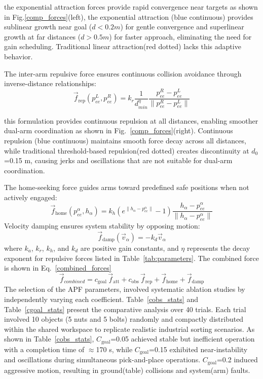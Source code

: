 \documentclass[pdflatex,sn-mathphys-num]{sn-jnl}%
\theoremstyle{thmstyleone}%
\theoremstyle{thmstylethree}%
\begin{document}
\noindent the exponential attraction forces provide rapid convergence near targets as shown in Fig.\ref{comp_forces}(left), the exponential attraction (blue continuous) provides sublinear growth near goal ($d<0.2m$) for gentle convergence and superlinear growth at far distances ($d>0.5m$) for faster approach, eliminating the need for gain scheduling. Traditional linear attraction(red dotted) lacks this adaptive behavior.

\noindent The inter-arm repulsive force ensures continuous collision avoidance through inverse-distance relationships:
\begin{equation}
\vec{f}_{\text{rep}}(p_{ee}^L, p_{ee}^R) = k_r \frac{1}{d_{min}^{\eta}} \frac{p_{ee}^R - p_{ee}^L}{\lVert p_{ee}^R - p_{ee}^L\rVert}
\label{eq:repulsive_force}
\end{equation}

this formulation provides continuous repulsion at all distances, enabling smoother dual-arm coordination as shown in Fig.~\ref{comp_forces}(right). Continuous repulsion (blue continuous) maintains smooth force decay across all distances, while traditional threshold-based repulsion(red dotted) creates discontinuity at $d_{0}$=0.15 m, causing jerks and oscillations that are not suitable for dual-arm coordination.

\noindent The home-seeking force guides arms toward predefined safe positions when not actively engaged:
\begin{equation}
\vec{f}_{\text{home}}(p_{ee}^{\alpha}, h_{\alpha}) = 
k_h \left(e^{\lVert h_{\alpha} - p_{ee}^{\alpha}\rVert} - 1\right) 
\frac{h_{\alpha} - p_{ee}^{\alpha}}{\lVert h_{\alpha} - p_{ee}^{\alpha}\rVert}
\label{eq:home_force}
\end{equation}
Velocity damping ensures system stability by opposing motion:
\begin{equation}
\vec{f}_{\text{damp}}(\vec{v}_{\alpha}) = -k_d \vec{v}_{\alpha}
\label{eq:damping_force}
\end{equation}
where $k_a$, $k_r$, $k_h$, and $k_d$ are positive gain constants, and $\eta$ represents the decay exponent for repulsive forces listed in Table~\ref{tab:parameters}.
The combined force is shown in Eq.~\ref{combined_forces}
\begin{equation}
    \vec{f}_{combined} = c_{\text{goal}}\,\vec{f}_{\text{att}} + c_{\text{obs}}\,\vec{f}_{\text{rep}} + \vec{f}_{\text{home}} + \vec{f}_{\text{damp}}
    \label{combined_forces}
\end{equation}
The selection of the APF parameters, involved systematic ablation studies by independently varying each coefficient. Table~\ref{cobs_stats} and Table~\ref{cgoal_stats} present the comparative analysis over 40 trials. Each trial involved 10 objects (5 nuts and 5 bolts) randomly and compactly distributed within the shared workspace to replicate realistic industrial sorting scenarios. As shown in Table~\ref{cobs_stats}, $C_{\text{goal}}$=0.05 achieved stable but inefficient operation with a completion time of $\approx$170 s, while $C_{\text{goal}}$=0.15 exhibited near-instability and oscillations during simultaneous pick-and-place operations. $C_{\text{goal}}$=0.2 induced aggressive motion, resulting in ground(table) collisions and system(arm) faults.
\end{document}
